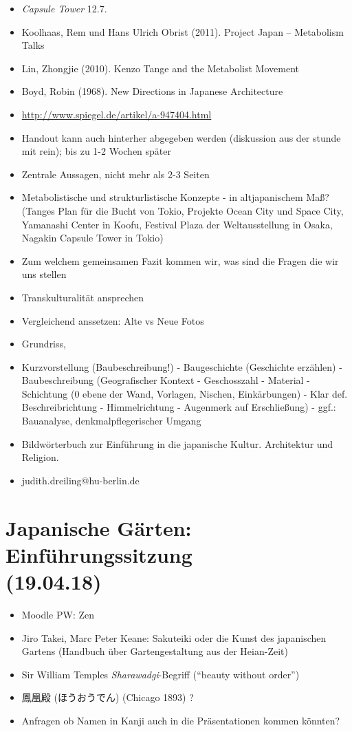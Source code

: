 \documentclass[emulatestandardclasses]{scrartcl}
\begin{document}
\begin{itemize}
  \item \emph{Capsule Tower} 12.7.
  \item Koolhaas, Rem und Hans Ulrich Obrist (2011). Project Japan – Metabolism Talks
  \item Lin, Zhongjie (2010). Kenzo Tange and the Metabolist Movement
  \item Boyd, Robin (1968). New Directions in Japanese Architecture
  \item \url{http://www.spiegel.de/artikel/a-947404.html}
  \item Handout kann auch hinterher abgegeben werden (diskussion aus der stunde mit rein); bis zu 1-2 Wochen später
  \item Zentrale Aussagen, nicht mehr als 2-3 Seiten
  \item Metabolistische und strukturlistische Konzepte - in altjapanischem Maß? (Tanges Plan für die Bucht von Tokio, Projekte Ocean City und Space City, Yamanashi Center in Koofu, Festival Plaza der Weltausstellung in Osaka, Nagakin Capsule Tower in Tokio)
  \item Zum welchem gemeinsamen Fazit kommen wir, was sind die Fragen die wir uns stellen
  \item Transkulturalität ansprechen
  \item Vergleichend anssetzen: Alte vs Neue Fotos
  \item Grundriss,
  \item Kurzvorstellung (Baubeschreibung!) - Baugeschichte (Geschichte erzählen) - Baubeschreibung (Geografischer Kontext - Geschosszahl - Material - Schichtung (0 ebene der Wand, Vorlagen, Nischen, Einkärbungen) - Klar def. Beschreibrichtung - Himmelrichtung - Augenmerk auf Erschließung) - ggf.: Bauanalyse, denkmalpflegerischer Umgang
  \item Bildwörterbuch zur Einführung in die japanische Kultur. Architektur und Religion. 
  \item judith.dreiling@hu-berlin.de
\end{itemize}


\section{Japanische Gärten: Einführungssitzung\\(19.04.18)}

\begin{itemize}
  \item Moodle PW: Zen
  \item Jiro Takei, Marc Peter Keane: Sakuteiki oder die Kunst des japanischen Gartens (Handbuch über Gartengestaltung aus der Heian-Zeit)
  \item Sir William Temples \emph{Sharawadgi}-Begriff ("`beauty without order"')
  \item 鳳凰殿 (ほうおうでん) (Chicago 1893) ?
  \item Anfragen ob Namen in Kanji auch in die Präsentationen kommen könnten?
\end{itemize}
\end{document}
